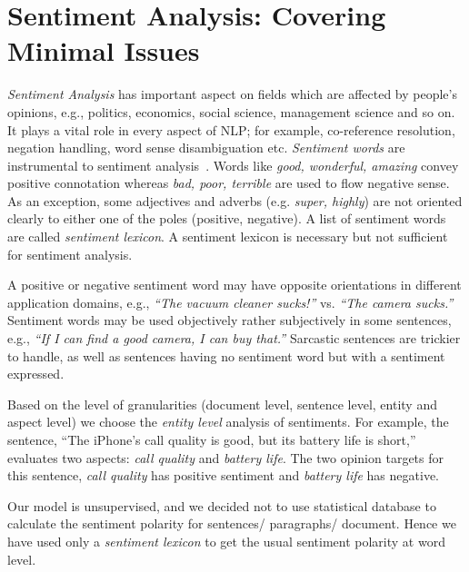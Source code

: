 \documentclass[a4paper]{report}
\begin{document}
\section{Sentiment Analysis: Covering Minimal Issues}

\emph{Sentiment Analysis} has important aspect on fields which are affected by people's opinions, e.g., politics, economics, social science, management science and so on. It plays a vital role in every aspect of NLP; for example, co-reference resolution, negation handling, word sense disambiguation etc. \emph{Sentiment words} are instrumental to sentiment analysis~\cite{doi:10.2200/S00416ED1V01Y201204HLT016}. Words like \emph{good, wonderful, amazing} convey positive connotation whereas \emph{bad, poor, terrible} are used to flow negative sense. As an exception, some adjectives and adverbs (e.g. \emph{super, highly}) are not oriented clearly to either one of the poles (positive, negative). A list of sentiment words are called \emph{sentiment lexicon}. A sentiment lexicon is necessary but not sufficient for sentiment analysis.
\par A positive or negative sentiment word may have opposite orientations in different application domains, e.g., \emph{``The vacuum cleaner sucks!''} vs. \emph{``The camera sucks.''} Sentiment words may be used objectively rather subjectively in some sentences, e.g., \emph{``If I can find a good camera, I can buy that.''} Sarcastic sentences are trickier to handle, as well as sentences having no sentiment word but with a sentiment expressed.
\par Based on the level of granularities (document level, sentence level, entity and aspect level) we choose the \emph{entity level} analysis of sentiments. For example, the sentence, ``The iPhone's call quality is good, but its battery life is short,'' evaluates two aspects: \emph{call quality} and \emph{battery life}. The two opinion targets for this sentence, \emph{call quality} has positive sentiment and \emph{battery life} has negative.
\par Our model is unsupervised, and we decided not to use statistical database to calculate the sentiment polarity for sentences/ paragraphs/ document. Hence we have used only a {\em sentiment lexicon} to get the usual sentiment polarity at word level.
\end{document}

